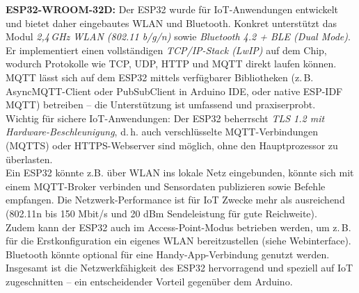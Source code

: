 \noindent\textbf{ESP32-WROOM-32D:} Der ESP32 wurde für IoT-Anwendungen entwickelt und bietet daher eingebautes WLAN und Bluetooth. Konkret unterstützt das Modul \textit{2{,}4\,GHz WLAN (802.11 b/g/n)} sowie \textit{Bluetooth 4.2 + BLE (Dual Mode)}. \autocite{esp32_comparison} 
\\
Er implementiert einen vollständigen \textit{TCP/IP-Stack (LwIP)} auf dem Chip, \autocite{esp_datasheet} wodurch Protokolle wie TCP, UDP, HTTP und MQTT direkt laufen können. MQTT lässt sich auf dem ESP32 mittels verfügbarer Bibliotheken (z.\,B. AsyncMQTT-Client oder PubSubClient in Arduino IDE, oder native ESP-IDF MQTT) betreiben – die Unterstützung ist umfassend und praxiserprobt. 
\\
Wichtig für sichere IoT-Anwendungen: Der ESP32 beherrscht \textit{TLS 1.2 mit Hardware-Beschleunigung}, \cite{esp_datasheet} d.\,h. auch verschlüsselte MQTT-Verbindungen (MQTTS) oder HTTPS-Webserver sind möglich, ohne den Hauptprozessor zu überlasten. 
\\
Ein ESP32 könnte z.B. über WLAN ins lokale Netz eingebunden, könnte sich mit einem MQTT-Broker verbinden und Sensordaten publizieren sowie Befehle empfangen. Die Netzwerk-Performance ist für IoT Zwecke mehr als ausreichend (802.11n bis 150 Mbit/s und 20 dBm Sendeleistung für gute Reichweite). \cite{esp_datasheet} 
\\
Zudem kann der ESP32 auch im Access-Point-Modus betrieben werden, um z.\,B. für die Erstkonfiguration ein eigenes WLAN bereitzustellen (siehe Webinterface). Bluetooth könnte optional für eine Handy-App-Verbindung genutzt werden. Insgesamt ist die Netzwerkfähigkeit des ESP32 hervorragend und speziell auf IoT zugeschnitten – ein entscheidender Vorteil gegenüber dem Arduino.


\vspace{5mm}


